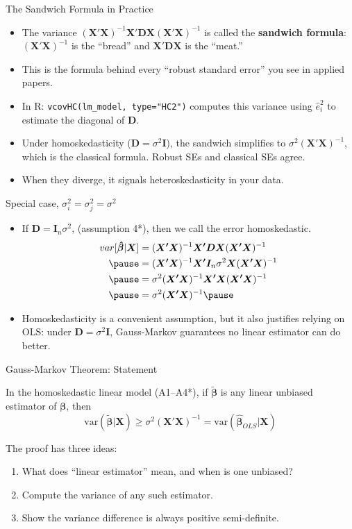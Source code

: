 \documentclass[aspectratio=169, handout]{beamer}
\numberwithin{equation}{section}
\begin{document}
\begin{frame}{The Sandwich Formula in Practice}
\begin{itemize}
\item The variance $(\bm{X'X})^{-1}\bm{X'DX}(\bm{X'X})^{-1}$ is called the \textbf{sandwich formula}: $\bm{(X'X)}^{-1}$ is the ``bread'' and $\bm{X'DX}$ is the ``meat.''\pause
\item This is the formula behind every ``robust standard error'' you see in applied papers.\pause
\item In R: \texttt{vcovHC(lm\_model, type="HC2")} computes this variance using $\hat{e}_i^2$ to estimate the diagonal of $\bm{D}$.\pause
\item Under homoskedasticity ($\bm{D}=\sigma^2\bm{I}$), the sandwich simplifies to $\sigma^2(\bm{X'X})^{-1}$, which is the classical formula. Robust SEs and classical SEs agree.
\item When they diverge, it signals heteroskedasticity in your data.
\end{itemize}
\end{frame}

\begin{frame}{Special case, $\sigma^2_i=\sigma^2_j=\sigma^2$}
\begin{itemize}
\item If $\bm{D}=\bm{I}_n\sigma^2$, (assumption 4*), then we call the error homoskedastic.
\begin{align*}
var[\bm{\hat{\beta}}|\bm{X}]&=(\bm{X'X})^{-1}\bm{X'}\bm{D}\bm{X}(\bm{X'X})^{-1}\\ \pause
&=(\bm{X'X})^{-1}\bm{X'}\bm{I}_n\sigma^2\bm{X}(\bm{X'X})^{-1}\\ \pause
&=\sigma^2(\bm{X'X})^{-1}\bm{X'}\bm{X}(\bm{X'X})^{-1}\\ \pause
&=\sigma^2(\bm{X'X})^{-1} \pause
\end{align*}
\item Homoskedasticity is a convenient assumption, but it also justifies relying on OLS: under $\bm{D}=\sigma^2\bm{I}$, Gauss-Markov guarantees no linear estimator can do better.
\end{itemize}
\end{frame}


\begin{frame}{Gauss-Markov Theorem: Statement}
\begin{tcolorbox}[colback=blue!5, colframe=blue!50, title=Theorem (Gauss-Markov)]
In the homoskedastic linear model (A1--A4*), if $\bm{\tilde{\beta}}$ is any linear unbiased estimator of $\bm{\beta}$, then
$$\text{var}(\bm{\tilde{\beta}}|\bm{X})\geq \sigma^2\bm{(X'X)}^{-1}=\text{var}(\hat{\bm{\beta}}_{OLS}|\bm{X})$$
\end{tcolorbox}
\pause
\medskip
The proof has three ideas:
\begin{enumerate}
\item What does ``linear estimator'' mean, and when is one unbiased?
\item Compute the variance of any such estimator.
\item Show the variance difference is always positive semi-definite.
\end{enumerate}
\end{frame}
\end{document}
